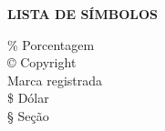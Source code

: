 \newpage
\begin{center}
    \textbf{LISTA DE SÍMBOLOS}
\end{center}

\noindent \% \hspace{1cm} Porcentagem\\
\noindent \copyright \hspace{1cm} Copyright\\
\noindent \textregistered \hspace{1cm} Marca registrada\\
\noindent \$ \hspace{1cm} Dólar\\
\noindent \S \hspace{1cm} Seção\\